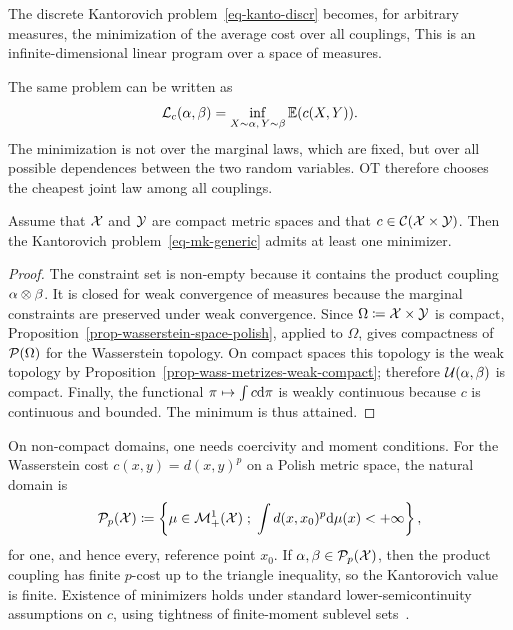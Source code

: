 The discrete Kantorovich problem~\eqref{eq-kanto-discr} becomes, for arbitrary measures, the minimization of the average cost over all couplings,
This is an infinite-dimensional linear program over a space of measures.

\begin{rem}
	The same problem can be written as
	\[
		\mathcal{L}_c(\alpha,\beta)
		=
		\inf_{X\sim\alpha,\,Y\sim\beta}\mathbb{E}(c(X,Y)).
	\]
	The minimization is not over the marginal laws, which are fixed, but over all possible dependences between the two random variables. OT therefore chooses the cheapest joint law among all couplings.
\end{rem}

\begin{prop}\label{prop-kantorovich-existence-compact}
	Assume that $\mathcal{X}$ and $\mathcal{Y}$ are compact metric spaces and that $c\in\mathcal{C}(\mathcal{X}\times\mathcal{Y})$. Then the Kantorovich problem~\eqref{eq-mk-generic} admits at least one minimizer.
\end{prop}
\begin{proof}
	The constraint set is non-empty because it contains the product coupling $\alpha\otimes\beta$. It is closed for weak convergence of measures because the marginal constraints are preserved under weak convergence. Since $\Omega\coloneqq\mathcal{X}\times\mathcal{Y}$ is compact, Proposition~\ref{prop-wasserstein-space-polish}, applied to $\Omega$, gives compactness of $\mathcal{P}(\Omega)$ for the Wasserstein topology. On compact spaces this topology is the weak topology by Proposition~\ref{prop-wass-metrizes-weak-compact}; therefore $\mathcal{U}(\alpha,\beta)$ is compact. Finally, the functional $\pi\mapsto\int c\mathrm{d}\pi$ is weakly continuous because $c$ is continuous and bounded. The minimum is thus attained.
\end{proof}

On non-compact domains, one needs coercivity and moment conditions. For the Wasserstein cost $c(x,y)=d(x,y)^p$ on a Polish metric space, the natural domain is
\[
	\mathcal P_p(\mathcal{X})
	\coloneqq
	\left\{ \mu\in\mathcal{M}_+^1(\mathcal{X}) \;;\; \int d(x,x_0)^p\mathrm{d}\mu(x)<+\infty \right\},
\]
for one, and hence every, reference point $x_0$. If $\alpha,\beta\in\mathcal P_p(\mathcal{X})$, then the product coupling has finite $p$-cost up to the triangle inequality, so the Kantorovich value is finite. Existence of minimizers holds under standard lower-semicontinuity assumptions on $c$, using tightness of finite-moment sublevel sets~\cite{Villani09,SantambrogioBook}.

